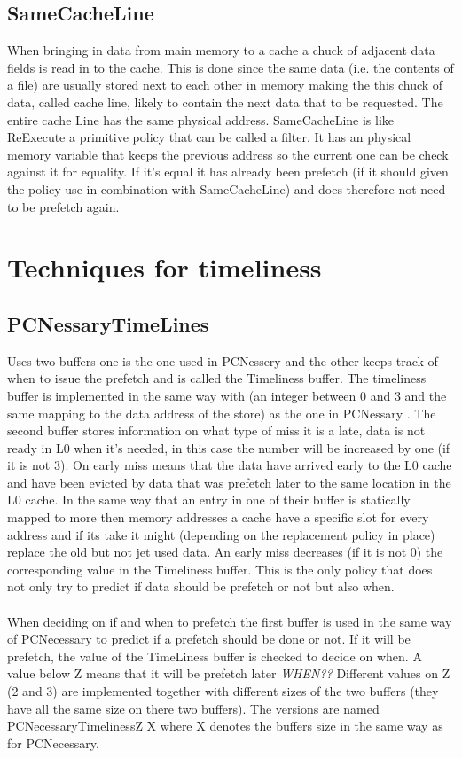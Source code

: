  \subsection{SameCacheLine}
When bringing in data from main memory to a cache a chuck of adjacent data fields is read in to the cache. This is done since the same data (i.e. the contents of a file) are usually stored next to each other in memory making the this chuck of data, called cache line, likely to contain the next data that to be requested. The entire cache Line has the same physical address. SameCacheLine is like ReExecute a primitive policy that can be called a filter. It has an physical memory variable that keeps the previous address so the current one can be check against it for equality. If it's equal it has already been prefetch (if it should given the policy use in combination with SameCacheLine) and does therefore not need to be prefetch again.  


\section{Techniques for timeliness} 

\subsection{PCNessaryTimeLines}

Uses two buffers one is the one used in PCNessery and the other keeps track of when to issue the prefetch and is called the Timeliness buffer. The timeliness buffer is implemented in the same way with (an integer between 0 and 3 and the same mapping to the data address  of the store) as the one in PCNessary \fixme.    The second buffer stores information on what type of miss it is a late, data is not ready in L0 when it's needed, in this case the number will be increased by one (if it is not 3). On early miss means that the data have arrived early to  the L0 cache and have been evicted by data that was prefetch later to the same location in the L0 cache. In the same way that an entry in one of their buffer is statically mapped to more then memory addresses a cache have a specific slot for every address and if its take it might (depending on the replacement policy in place) replace the old but not jet used data. An early miss decreases (if it is not 0) the corresponding value in the Timeliness buffer. This is the only policy that does not only try to predict if data should be prefetch or not but also when.  \\ \\

When deciding on if and when to prefetch the first buffer is used in the same way of PCNecessary \fixme to predict if a prefetch should be done or not. If it will be prefetch, the value of the TimeLiness buffer is checked to decide on when. A value below Z means that it will be prefetch later \emph{WHEN??} Different values on Z (2 and 3) are implemented together with different sizes of the two buffers (they have all the same size on there two buffers). The versions are named PCNecessaryTimelinessZ X where X denotes the buffers size in the same way as for PCNecessary. 



